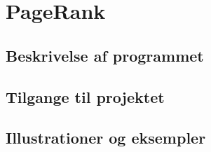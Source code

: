 
\section{PageRank}

\subsection*{Beskrivelse af programmet}

\subsection*{Tilgange til projektet}

\subsection*{Illustrationer og eksempler}